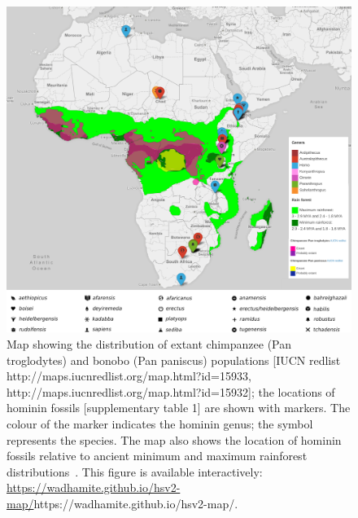 \documentclass[fleqn,10pt]{wlscirep}
\begin{document}
\begin{figure}[!htbp]
  \centering
  \includegraphics[width=\textwidth]{figs/chimpanzee-rainforest}
  \caption{
  	Map showing the distribution of extant chimpanzee (Pan troglodytes) and bonobo (Pan paniscus) populations [IUCN redlist http://maps.iucnredlist.org/map.html?id=15933, http://maps.iucnredlist.org/map.html?id=15932]; the locations of hominin fossils [supplementary table 1] are shown with markers. The colour of the marker indicates the hominin genus; the symbol represents the species. The map also shows the location of hominin fossils relative to ancient minimum and maximum rainforest distributions~\citep{Peel2007}. This figure is available interactively: \url{https://wadhamite.github.io/hsv2-map/}{https://wadhamite.github.io/hsv2-map/}.}
  \label{fig:chimpanzee-rainforest}
\end{figure}
\end{document}
